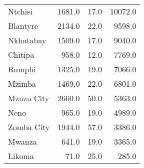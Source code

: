 \begin{tabular}{lrrr}
Ntchisi        &      1681.0 &         17.0 &          10072.0 \\
Blantyre       &      2134.0 &         22.0 &           9598.0 \\
Nkhatabay      &      1509.0 &         17.0 &           9040.0 \\
Chitipa        &       958.0 &         12.0 &           7769.0 \\
Rumphi         &      1325.0 &         19.0 &           7066.0 \\
Mzimba         &      1469.0 &         22.0 &           6801.0 \\
Mzuzu City     &      2660.0 &         50.0 &           5363.0 \\
Neno           &       965.0 &         19.0 &           4989.0 \\
Zomba City     &      1944.0 &         57.0 &           3386.0 \\
Mwanza         &       641.0 &         19.0 &           3365.0 \\
Likoma         &        71.0 &         25.0 &            285.0 \\
\bottomrule
\end{tabular}
